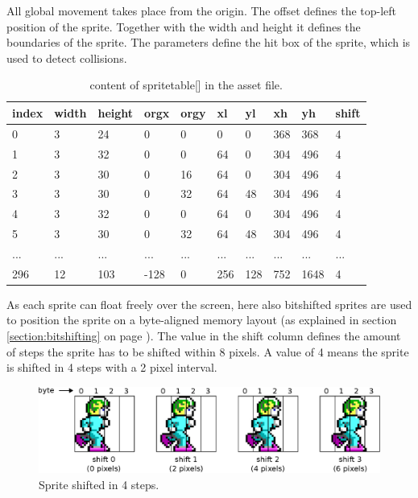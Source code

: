\documentclass[book.tex]{subfiles}
\begin{document}
All global movement takes place from the origin. The offset  defines the top-left position of the sprite. Together with the width and height it defines the boundaries of the sprite. The parameters  define the hit box of the sprite, which is used to detect collisions.\\

\begin{table}[H]
  \begin{tabularx}{\textwidth}[c]{lXXXXXXXXX}
  \hline
  \textbf{index} & \textbf{width} & \textbf{height} & \textbf{orgx} & \textbf{orgy}
    & \textbf{xl} & \textbf{yl} & \textbf{xh} & \textbf{yh} & \textbf{shift} \\ \hline
  0  &   3  &   24  &   0  &   0  &   0  &   0  &   368  &   368  &   4 \\
  1  &   3  &   32  &   0  &   0  &   64  &   0  &   304  &   496  &   4 \\
  2  &   3  &   30  &   0  &   16  &   64  &   0  &   304  &   496  &   4 \\
  3  &   3  &   30  &   0  &   32  &   64  &   48  &   304  &   496  &   4 \\
  4  &   3  &   32  &   0  &   0  &   64  &   0  &   304  &   496  &   4 \\
  5  &   3  &   30  &   0  &   32  &   64  &   48  &   304  &   496  &   4 \\
 ...  &   ...  &   ...  &   ...  &   ...  &   ...  &   ...  &   ...  &   ...  &   ... \\
 296  &   12  &   103  &   -128  &   0  &   256  &   128  &   752  &   1648  &   4\\
  \end{tabularx}
  \caption{content of spritetable[] in the  asset file.}
  \label{table:spritetable}
\end{table}

As each sprite can float freely over the screen, here also bitshifted sprites are used to position the sprite on a byte-aligned memory layout (as explained in section \ref{section:bitshifting} on page \pageref{section:bitshifting}). The value in the shift column defines the amount of steps the sprite has to be shifted within 8 pixels. A value of 4 means the sprite is shifted in 4 steps with a 2 pixel interval.\\ 

\begin{figure}[H]
  \centering
  \includegraphics[width=\textwidth]{imgs/drawings/sprite_shift.eps}
  \caption{Sprite shifted in 4 steps.}
  \label{fig:sprite_shift}  
\end{figure}
 
\end{document}

